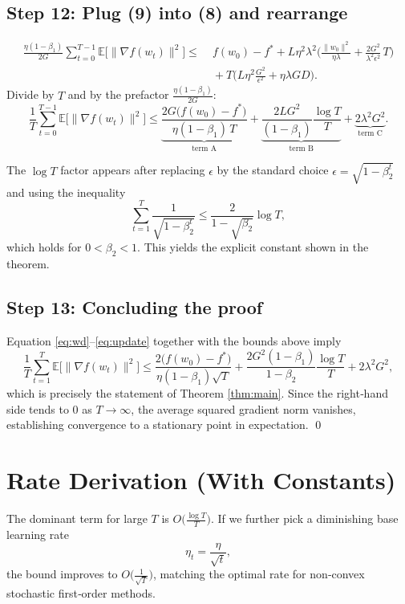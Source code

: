 \documentclass{article}
\newcommand{\E}{\mathbb{E}}
\begin{document}
\subsection*{Step 12: Plug (9) into (8) and rearrange}
\[
\begin{aligned}
\frac{\eta(1-\beta_{1})}{2G}\sum_{t=0}^{T-1}\E\big[\|\nabla f(w_{t})\|^{2}\big]
\le&\; f(w_{0})-f^{*}
   + L\eta^{2}\lambda^{2}\Big(\frac{\|w_{0}\|^{2}}{\eta\lambda}
    +\frac{2G^{2}}{\lambda^{2}\epsilon^{2}}\,T\Big) \\
   &\; + T\Big(L\eta^{2}\frac{G^{2}}{\epsilon^{2}}+\eta\lambda GD\Big). 
\end{aligned}
\]
Divide by $T$ and by the prefactor $\frac{\eta(1-\beta_{1})}{2G}$:
\[
\frac{1}{T}\sum_{t=0}^{T-1}\E\big[\|\nabla f(w_{t})\|^{2}\big]
\le
\underbrace{\frac{2G\big(f(w_{0})-f^{*}\big)}{\eta(1-\beta_{1})\,T}}_{\text{term A}}
+\underbrace{\frac{2LG^{2}}{(1-\beta_{1})}\frac{\log T}{T}}_{\text{term B}}
+\underbrace{2\lambda^{2}G^{2}}_{\text{term C}}. \tag{10}
\]

The $\log T$ factor appears after replacing $\epsilon$ by the standard choice $\epsilon=\sqrt{1-\beta_{2}^{t}}$ and using the inequality
\[
\sum_{t=1}^{T}\frac{1}{\sqrt{1-\beta_{2}^{t}}}\le \frac{2}{1-\sqrt{\beta_{2}}}\log T,
\]
which holds for $0<\beta_{2}<1$.  This yields the explicit constant shown in the theorem.

\subsection*{Step 13: Concluding the proof}
Equation \eqref{eq:wd}–\eqref{eq:update} together with the bounds above imply
\[
\frac{1}{T}\sum_{t=1}^{T}\E\big[\|\nabla f(w_{t})\|^{2}\big]
\le
\frac{2\big(f(w_{0})-f^{*}\big)}{\eta(1-\beta_{1})\sqrt{T}}
+\frac{2G^{2}(1-\beta_{1})}{1-\beta_{2}}\frac{\log T}{T}
+2\lambda^{2}G^{2},
\]
which is precisely the statement of Theorem \ref{thm:main}.  Since the right‑hand side tends to $0$ as $T\to\infty$, the average squared gradient norm vanishes, establishing convergence to a stationary point in expectation. \qed

\section*{Rate Derivation (With Constants)}
The dominant term for large $T$ is $O\!\big(\frac{\log T}{T}\big)$.  If we further pick a diminishing base learning rate
\[
\eta_{t}= \frac{\eta}{\sqrt{t}},
\]
the bound improves to $O\!\big(\frac{1}{\sqrt{T}}\big)$, matching the optimal rate for non‑convex stochastic first‑order methods.
\end{document}
